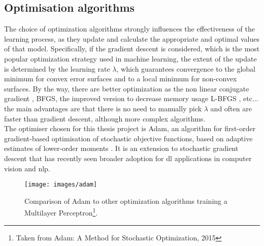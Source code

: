 \subsection{Optimisation algorithms}
\label{nn:optmalgo}
The choice of optimization algorithms strongly influences the effectiveness of the learning process, as they update and calculate the appropriate and optimal values of that model. Specifically, if the gradient descent is considered, which is the most popular optimization strategy used in machine learning, the extent of the update is determined by the learning rate $\lambda$, which guarantees convergence to the global minimum for convex error surfaces and to a local minimum for non-convex surfaces. By the way, there are better optimization as the non linear conjugate gradient \cite[]{conjugategradient}, BFGS, the improved version to decrease memory usage L-BFGS \cite[]{saputro2017limited}, etc... the main advantages are that there is no need to manually pick $\lambda$ and often are faster than gradient descent, although more complex algorithms. \\

\noindent The optimiser chosen for this thesis project is Adam, an algorithm for first-order gradient-based optimisation of stochastic objective functions, based on adaptive estimates of lower-order moments \cite[]{kingma2017adam}. It is an extension to stochastic gradient descent that has recently seen broader adoption for \gls{dl} applications in computer vision and \gls{nlp}.

\begin{figure}[H]
	\begin{minipage}{\textwidth}
		\centering
		\texttt{[image: images/adam]}
		\caption[Comparison of Adam to other optimization algorithms.]{Comparison of Adam to other optimization algorithms training a Multilayer Perceptron\footnote{Taken from Adam: A Method for Stochastic Optimization, 2015}.}
		\label{fig:adam}
	\end{minipage}
\end{figure}